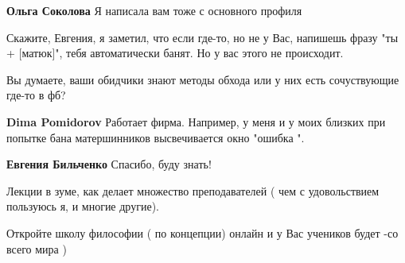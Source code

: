 \begin{itemize}
\begin{itemize}
 
\textbf{Ольга Соколова} Я написала вам тоже с основного профиля
\end{itemize}

 

Скажите, Евгения, я заметил, что если где-то, но не у Вас, напишешь фразу "ты +
[матюк]", тебя автоматически банят. Но у вас этого не происходит.

Вы думаете, ваши обидчики знают методы обхода или у них есть сочуствующие
где-то в фб?

\begin{itemize}
 
\textbf{Dima Pomidorov} Работает фирма. Например, у меня и у моих близких при попытке бана матершинников высвечивается окно "ошибка ".

 
\textbf{Евгения Бильченко} Спасибо, буду знать!
\end{itemize}

 

Лекции в зуме, как делает множество преподавателей ( чем с удовольствием
пользуюсь я, и многие другие).

Откройте школу философии ( по концепции) онлайн и у Вас учеников будет -со
всего мира )


\end{itemize}
